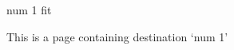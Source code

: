\newpage

\pdfdest                %
    num 1               %
    fit                 %

This is a page containing destination `num 1'

\newpage


